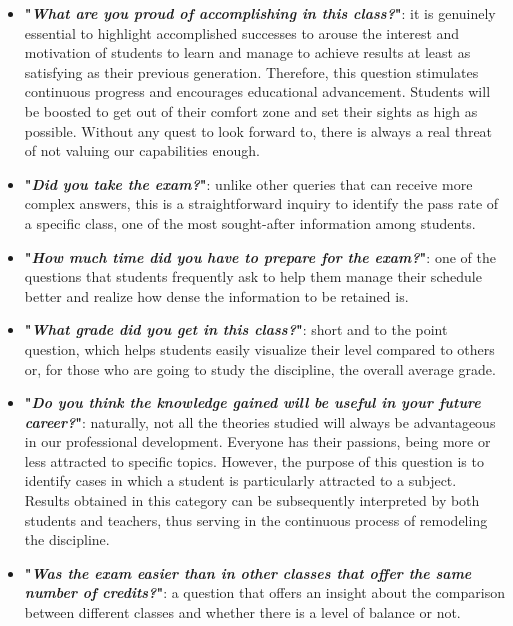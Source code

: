 \begin{itemize}
            \item \textbf{"\textit{What are you proud of accomplishing in this class?}"}: it is genuinely essential to highlight accomplished successes to arouse the interest and motivation of students to learn and manage to achieve results at least as satisfying as their previous generation. Therefore, this question stimulates continuous progress and encourages educational advancement. Students will be boosted to get out of their comfort zone and set their sights as high as possible. Without any quest to look forward to, there is always a real threat of not valuing our capabilities enough.
            
            \item \textbf{"\textit{Did you take the exam?}"}: unlike other queries that can receive more complex answers, this is a straightforward inquiry to identify the pass rate of a specific class, one of the most sought-after information among students.
            
            \item \textbf{"\textit{How much time did you have to prepare for the exam?}"}: one of the questions that students frequently ask to help them manage their schedule better and realize how dense the information to be retained is.
            
            \item \textbf{"\textit{What grade did you get in this class?}"}: short and to the point question, which helps students easily visualize their level compared to others or, for those who are going to study the discipline, the overall average grade.
            
            \item \textbf{"\textit{Do you think the knowledge gained will be useful in your future career?}"}: naturally, not all the theories studied will always be advantageous in our professional development. Everyone has their passions, being more or less attracted to specific topics. However, the purpose of this question is to identify cases in which a student is particularly attracted to a subject. Results obtained in this category can be subsequently interpreted by both students and teachers, thus serving in the continuous process of remodeling the discipline.
            
            \item \textbf{"\textit{Was the exam easier than in other classes that offer the same number of credits?}"}: a question that offers an insight about the comparison between different classes and whether there is a level of balance or not. 
            
    \end{itemize}

